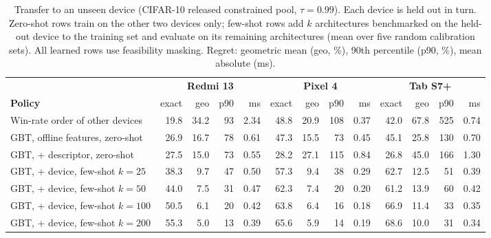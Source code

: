 \begin{table}[!htbp]
\centering
\caption{Transfer to an unseen device (CIFAR-10 released constrained pool,
$\tau=0.99$). Each device is held out in turn. Zero-shot rows train on the
other two devices only; few-shot rows add $k$ architectures benchmarked on the
held-out device to the training set and evaluate on its remaining
architectures (mean over five random calibration sets). All learned rows use
feasibility masking. Regret: geometric mean (geo, \%), 90th percentile (p90,
\%), mean absolute (ms).}
\label{tab:lodo}
\footnotesize
\setlength{\tabcolsep}{3.5pt}
\begin{tabular}{@{}l rrrr rrrr rrrr@{}}
\toprule
& \multicolumn{4}{c}{\textbf{Redmi 13}} & \multicolumn{4}{c}{\textbf{Pixel 4}} & \multicolumn{4}{c}{\textbf{Tab S7+}}\\
\cmidrule(lr){2-5}\cmidrule(lr){6-9}\cmidrule(lr){10-13}
\textbf{Policy} & exact & geo & p90 & ms & exact & geo & p90 & ms & exact & geo & p90 & ms\\
\midrule
Win-rate order of other devices & 19.8 & 34.2 & 93 & 2.34 & 48.8 & 20.9 & 108 & 0.37 & 42.0 & 67.8 & 525 & 0.74 \\
GBT, offline features, zero-shot & 26.9 & 16.7 & 78 & 0.61 & 47.3 & 15.5 & 73 & 0.45 & 45.1 & 25.8 & 130 & 0.70 \\
GBT, + descriptor, zero-shot & 27.5 & 15.0 & 73 & 0.55 & 28.2 & 27.1 & 115 & 0.84 & 26.8 & 45.0 & 166 & 1.30 \\
\midrule
GBT, + device, few-shot $k=25$ & 38.3 & 9.7 & 47 & 0.50 & 57.3 & 9.4 & 38 & 0.29 & 62.7 & 12.5 & 51 & 0.39 \\
GBT, + device, few-shot $k=50$ & 44.0 & 7.5 & 31 & 0.47 & 62.3 & 7.4 & 20 & 0.20 & 61.2 & 13.9 & 60 & 0.42 \\
GBT, + device, few-shot $k=100$ & 50.5 & 6.1 & 20 & 0.42 & 63.8 & 6.4 & 16 & 0.18 & 66.9 & 11.4 & 33 & 0.35 \\
GBT, + device, few-shot $k=200$ & 55.3 & 5.0 & 13 & 0.39 & 65.6 & 5.9 & 14 & 0.19 & 68.6 & 10.0 & 31 & 0.34 \\
\bottomrule
\end{tabular}
\end{table}
